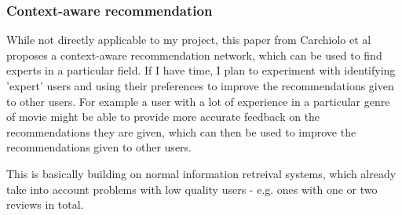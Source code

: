 \subsubsection{Context-aware recommendation}
While not directly applicable to my project, this paper from Carchiolo et al\cite{CARCHIOLO20151086} proposes a context-aware recommendation network, which can be used to find experts in a particular field.
If I have time, I plan to experiment with identifying 'expert' users and using their preferences to improve the recommendations given to other users. For example a user with a lot of experience in a particular genre of movie might be able to provide more accurate feedback on the recommendations they are given, which can then be used to improve the recommendations given to other users.

This is basically building on normal information retreival systems, which already take into account problems with low quality users - e.g. ones with one or two reviews in total.

